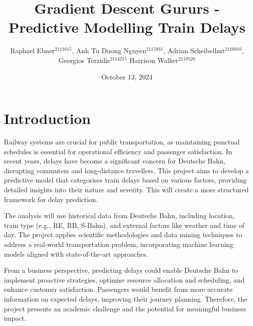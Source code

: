 \documentclass[a4paper,oneside,bibliography=totoc]{scrbook}
\begin{document}
\frontmatter \subject{Data Mining Project Outline HWS24} %
\title{Gradient Descent Gururs - Predictive Modelling Train Delays}
\author{Raphael Ebner$^{2111615}$, Anh Tu Duong Nguyen$^{2115931}$, Adrian Scheibelhut$^{2110910}$,\\ Georgios Terzidis$^{2114215}$ Harrison Walker$^{2118520}$} \date{October 13, 2024}
\publishers{{\small Submitted to}\\
Data and Web Science Group\\
Prof.\ Dr.\ Hertling\\
University of Mannheim\\}

\maketitle


\mainmatter

\chapter{Introduction}
\label{ch:intro}

Railway systems are crucial for public transportation,
as maintaining punctual schedules is essential for operational efficiency and passenger satisfaction.
In recent years, delays have become a significant concern for Deutsche Bahn,
disrupting commuters and long-distance travellers.
This project aims to develop a predictive model that categorises train delays based on various factors,
providing detailed insights into their nature and severity.
This will create a more structured framework for delay prediction.

The analysis will use historical data from Deutsche Bahn, including location,
train type (e.g., RE, RB, S-Bahn), and external factors like weather and time of day.
The project applies scientific methodologies and data mining techniques to address a real-world transportation problem,
incorporating machine learning models aligned with state-of-the-art approaches.

From a business perspective, predicting delays could enable Deutsche Bahn to implement proactive strategies,
optimise resource allocation and scheduling,
and enhance customer satisfaction.
Passengers would benefit from more accurate information on expected delays, improving their journey planning.
Therefore, the project presents an academic challenge and the potential for meaningful business impact.
\end{document}
